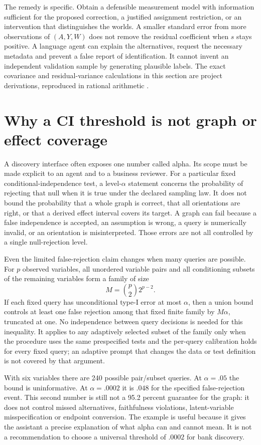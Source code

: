 The remedy is specific. Obtain a defensible measurement model with information
sufficient for the proposed correction, a justified assignment restriction, or
an intervention that distinguishes the worlds. A smaller standard error from
more observations of $(A,Y,W)$ does not remove the residual coefficient when
$s$ stays positive. A language agent can explain the alternatives, request the
necessary metadata and prevent a false report of identification. It cannot
invent an independent validation sample by generating plausible labels.
The exact covariance and residual-variance calculations in this section are
project derivations, reproduced in rational arithmetic
\citep{exec14_discovery_oracles}.

\section{Why a CI threshold is not graph or effect coverage}

A discovery interface often exposes one number called alpha. Its scope must be
made explicit to an agent and to a business reviewer. For a particular fixed
conditional-independence test, a level-$\alpha$ statement concerns the
probability of rejecting that null when it is true under the declared sampling
law. It does not bound the probability that a whole graph is correct, that all
orientations are right, or that a derived effect interval covers its target.
A graph can fail because a false independence is accepted, an assumption is
wrong, a query is numerically invalid, or an orientation is misinterpreted.
Those errors are not all controlled by a single null-rejection level.

Even the limited false-rejection claim changes when many queries are possible.
For $p$ observed variables, all unordered variable pairs and all conditioning
subsets of the remaining variables form a family of size
\[
 M=\binom p2 2^{p-2}.
\]
If each fixed query has unconditional type-I error at most $\alpha$, then a
union bound controls at least one false rejection among that fixed finite
family by $M\alpha$, truncated at one. No independence between query decisions
is needed for this inequality. It applies to any adaptively selected subset of
the family only when the procedure uses the same prespecified tests and the
per-query calibration holds for every fixed query; an adaptive prompt that
changes the data or test definition is not covered by that argument.

With six variables there are 240 possible pair/subset queries. At $\alpha=.05$
the bound is uninformative. At $\alpha=.0002$ it is $.048$ for the specified
false-rejection event. This second number is still not a 95.2 percent guarantee
for the graph: it does not control missed alternatives, faithfulness violations,
latent-variable misspecification or endpoint conversion. The example is useful
because it gives the assistant a precise explanation of what alpha can and
cannot mean. It is not a recommendation to choose a universal threshold of
$.0002$ for bank discovery.

